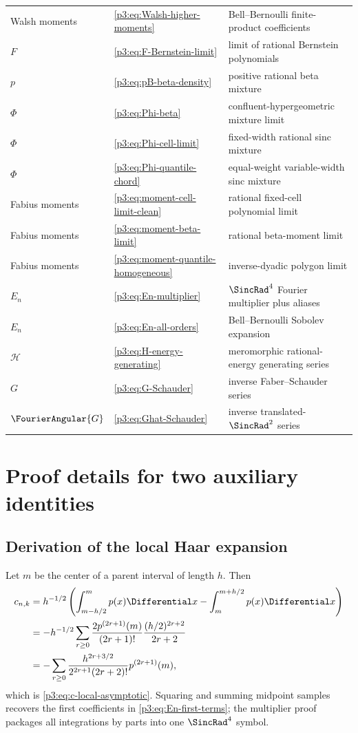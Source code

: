 \documentclass[11pt]{article}
\theoremstyle{definition}
\theoremstyle{remark}
\begin{document}
\begin{longtable}{@{}p{}p{}p{}@{}}
Walsh moments & \eqref{p3:eq:Walsh-higher-moments} & Bell--Bernoulli finite-product coefficients\\
$F$ & \eqref{p3:eq:F-Bernstein-limit} & limit of rational Bernstein polynomials\\
$p$ & \eqref{p3:eq:pB-beta-density} & positive rational beta mixture\\
$\Phi$ & \eqref{p3:eq:Phi-beta} & confluent-hypergeometric mixture limit\\
$\Phi$ & \eqref{p3:eq:Phi-cell-limit} & fixed-width rational sinc mixture\\
$\Phi$ & \eqref{p3:eq:Phi-quantile-chord} & equal-weight variable-width sinc mixture\\
Fabius moments & \eqref{p3:eq:moment-cell-limit-clean} & rational fixed-cell polynomial limit\\
Fabius moments & \eqref{p3:eq:moment-beta-limit} & rational beta-moment limit\\
Fabius moments & \eqref{p3:eq:moment-quantile-homogeneous} & inverse-dyadic polygon limit\\
$E_n$ & \eqref{p3:eq:En-multiplier} & $\SincRad^4$ Fourier multiplier plus aliases\\
$E_n$ & \eqref{p3:eq:En-all-orders} & Bell--Bernoulli Sobolev expansion\\
$\mathcal H$ & \eqref{p3:eq:H-energy-generating} & meromorphic rational-energy generating series\\
$G$ & \eqref{p3:eq:G-Schauder} & inverse Faber--Schauder series\\
$\FourierAngular{G}$ & \eqref{p3:eq:Ghat-Schauder} & inverse translated-$\SincRad^2$ series\\
\bottomrule
\end{longtable}

\section{Proof details for two auxiliary identities}
\label{p3:app:proof-details}

\subsection{Derivation of the local Haar expansion}

Let $m$ be the center of a parent interval of length $h$.  Then
\begin{align*}
 c_{n,k}
 &=h^{-1/2}\left(
   \int_{m-h/2}^{m}p(x)\Differential x-
   \int_m^{m+h/2}p(x)\Differential x\right)\\
 &=-h^{-1/2}\sum_{r\ge0}
   \frac{2p^{(2r+1)}(m)}{(2r+1)!}
   \frac{(h/2)^{2r+2}}{2r+2}\\
 &=-\sum_{r\ge0}
   \frac{h^{2r+3/2}}{2^{2r+1}(2r+2)!}p^{(2r+1)}(m),
\end{align*}
which is \eqref{p3:eq:c-local-asymptotic}.  Squaring and summing midpoint samples
recovers the first coefficients in \eqref{p3:eq:En-first-terms}; the multiplier
proof packages all integrations by parts into one $\SincRad^4$ symbol.
\end{document}

